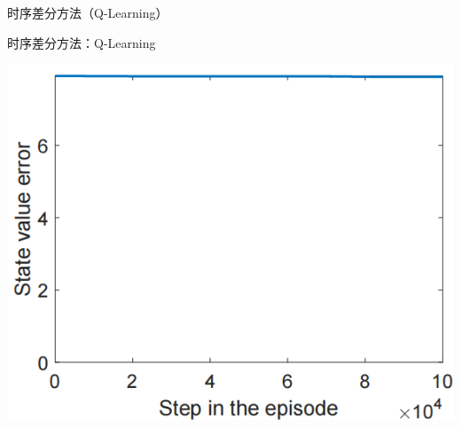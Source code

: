 \begin{section}{时序差分方法\alert{（Q-Learning）}}
\begin{frame}{时序差分方法：Q-Learning}
\begin{center}
\begin{minipage}{0.2\textwidth}
        \end{minipage}
        \hspace{1cm}
        \begin{minipage}{0.2\textwidth}
            \centering
            \includegraphics[width=\linewidth]{assets/e0.1statevalueerror.jpg}
        \end{minipage}
    \end{center}


\end{frame}
\end{section}
